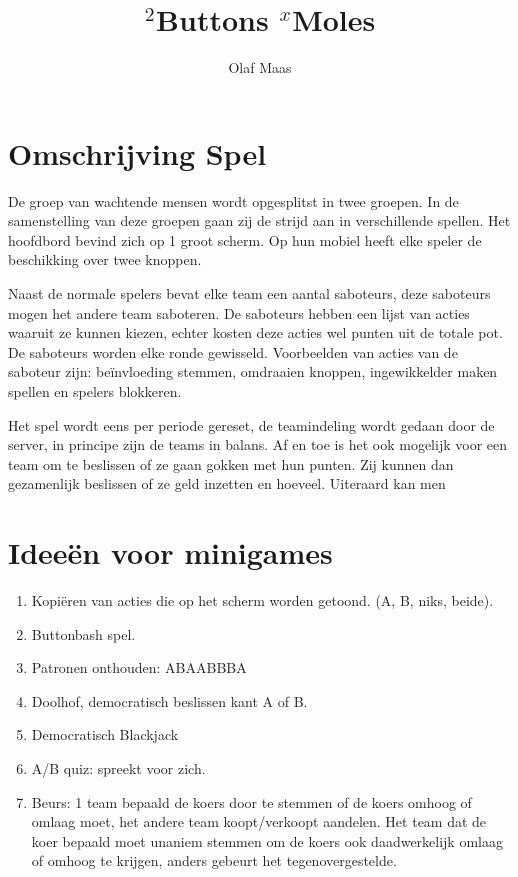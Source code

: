 \documentclass[a4paper, fleqn]{article}
\title{$^2$Buttons $^x$Moles}
\author{Olaf Maas}
\begin{document}
\maketitle
\section{Omschrijving Spel}
De groep van wachtende mensen wordt opgesplitst in twee groepen. In de samenstelling van deze groepen gaan zij de strijd aan in verschillende spellen. Het hoofdbord bevind zich op 1 groot scherm. Op hun mobiel heeft elke speler de beschikking over twee knoppen. 

Naast de normale spelers bevat elke team een aantal saboteurs, deze saboteurs mogen het andere team saboteren. De saboteurs hebben een lijst van acties waaruit ze kunnen kiezen, echter kosten deze acties wel punten uit de totale pot. De saboteurs worden elke ronde gewisseld. Voorbeelden van acties van de saboteur zijn: be\"invloeding stemmen, omdraaien knoppen, ingewikkelder maken spellen en spelers blokkeren. 

Het spel wordt eens per periode gereset, de teamindeling wordt gedaan door de server, in principe zijn de teams in balans.  Af en toe is het ook mogelijk voor een team om te beslissen of ze gaan gokken met hun punten. Zij kunnen dan gezamenlijk beslissen of ze geld inzetten en hoeveel. Uiteraard kan men 

\section{Idee\"en voor minigames}
\begin{enumerate}
\item Kopi\"eren van acties die op het scherm worden getoond. (A, B, niks, beide).
\item Buttonbash spel.
\item Patronen onthouden: ABAABBBA
\item Doolhof, democratisch beslissen kant A of B.
\item Democratisch Blackjack
\item A/B quiz: spreekt voor zich. 
\item Beurs: 1 team bepaald de koers door te stemmen of de koers omhoog of omlaag moet, het andere team koopt/verkoopt aandelen. Het team dat de koer bepaald moet unaniem stemmen om de koers ook daadwerkelijk omlaag of omhoog te krijgen, anders gebeurt het tegenovergestelde. 
\end{enumerate}
\end{document}
